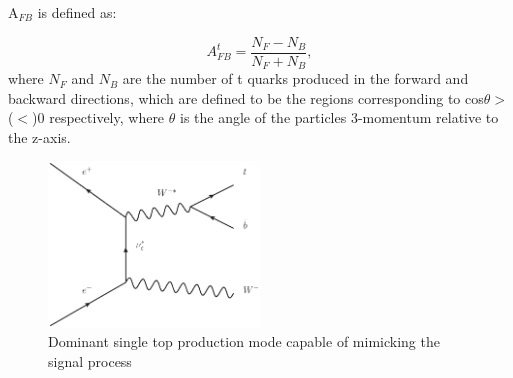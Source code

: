 A$_{FB}$ is defined as:

\begin{equation}
A_{FB}^t=\frac{N_F-N_B}{N_F+N_B},
\end{equation}
where $N_{F}$ and $N_{B}$ are the number of t quarks produced in the forward and backward directions, which are defined to be the regions corresponding to cos$\theta >$($<$)0 respectively, where $\theta$ is the angle of the particles 3-momentum relative to the z-axis.

\begin{figure}[]
  \centering
  \includegraphics[width=0.5\textwidth]{TopAnalysis/figures/SingleTop}
  \caption[Dominant single top production mode]{Dominant single top production mode capable of mimicking the signal process}
  \label{fig:singletop}
\end{figure}


